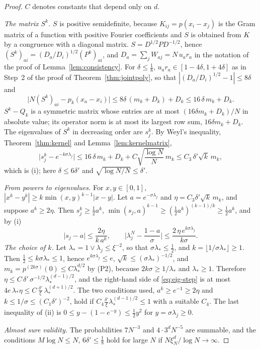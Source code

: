 \begin{proof}
$C$ denotes constants that depend only on $d$.

\emph{The matrix $S^k$.} $S$ is positive semidefinite, because $K_{ij}=p(x_i-x_j)$ is the Gram matrix of a function with positive Fourier coefficients and $S$ is obtained from $K$ by a congruence with a diagonal matrix. $S=D^{1/2}PD^{-1/2}$, hence $(S^k)_{ai}=(D_a/D_i)^{1/2}(P^k)_{ai}$, and $D_a=\sum_jW_{aj}=N\,u_ar_a$ in the notation of the proof of Lemma~\ref{lem:consistency}. For $\delta\le\frac18$, $u_ar_a\in[1-4\delta,1+4\delta]$ as in Step~2 of the proof of Theorem~\ref{thm:jointpoly}, so that $|(D_a/D_i)^{1/2}-1|\le8\delta$ and
\[
\big|N(S^k)_{ai}-p_k(x_a-x_i)\big|\le8\delta\,(m_k+D_k)+D_k\le16\,\delta\,m_k+D_k .
\]
$S^k-Q_k$ is a symmetric matrix whose entries are at most $(16\delta m_k+D_k)/N$ in absolute value; its operator norm is at most its largest row sum, $16\delta m_k+D_k$. The eigenvalues of $S^k$ in decreasing order are $s_j^k$. By Weyl's inequality, Theorem~\ref{thm:kernel} and Lemma~\ref{lem:kernelmatrix},
\[
\big|s_j^k-e^{-k\sigma\lambda_j}\big|\le16\,\delta\,m_k+D_k+C\sqrt{\frac{\log N}{N}}\,m_k\le C_3\,\delta'\sqrt k\,m_k ,
\]
which is (i); here $\delta\le6\delta'$ and $\sqrt{\log N/N}\le\delta'$.

\emph{From powers to eigenvalues.} For $x,y\in[0,1]$, $|x^k-y^k|\ge k\min(x,y)^{k-1}|x-y|$. Let $a=e^{-\sigma\lambda_j}$ and $\eta=C_3\delta'\sqrt k\,m_k$, and suppose $a^k\ge2\eta$. Then $s_j^k\ge\frac12a^k$, $\min(s_j,a)^{k-1}\ge(\frac12a^k)^{(k-1)/k}\ge\frac12a^k$, and by (i)
\begin{equation}\label{eq:eig-step}
\big|s_j-a\big|\le\frac{2\eta}{k\,a^k},\qquad\Big|\lambda^N_j-\frac{1-a}{\sigma}\Big|\le\frac{2\,\eta\,e^{k\sigma\lambda_j}}{k\sigma}.
\end{equation}
\emph{The choice of $k$.} Let $\lambda_*=1\vee\lambda_j\le\xi^{-2}$, so that $\sigma\lambda_*\le\frac12$, and $k=\lfloor1/\sigma\lambda_*\rfloor\ge1$. Then $\frac12\le k\sigma\lambda_*\le1$, hence $e^{k\sigma\lambda_j}\le e$, $\sqrt k\le(\sigma\lambda_*)^{-1/2}$, and $m_k=p^{(2k\sigma)}(0)\le C\lambda_*^{d/2}$ by (P2), because $2k\sigma\ge1/\lambda_*$ and $\lambda_*\ge1$. Therefore $\eta\le C\,\delta'\,\sigma^{-1/2}\lambda_*^{(d-1)/2}$, and the right-hand side of \eqref{eq:eig-step} is at most $4e\,\lambda_*\eta\le C\,\frac{\delta'}\xi\,\lambda_*^{(d+1)/2}$. The two conditions used, $a^k\ge e^{-1}\ge2\eta$ and $k\le1/\sigma\le(C_1\delta')^{-2}$, hold if $C_4\frac{\delta'}\xi\lambda_*^{(d-1)/2}\le1$ with a suitable $C_4$. The last inequality of (ii) is $0\le y-(1-e^{-y})\le\frac12y^2$ for $y=\sigma\lambda_j\ge0$.

\emph{Almost sure validity.} The probabilities $7N^{-3}$ and $4\cdot3^dN^{-5}$ are summable, and the conditions $M\log N\le N$, $6\delta'\le\frac18$ hold for large $N$ if $N\xi_N^{d}/\log N\to\infty$.
\end{proof}

